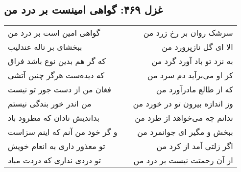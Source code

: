\begin{center}
\section*{غزل ۴۶۹: گواهی امینست بر درد من}
\label{sec:469}
\begin{longtable}{l p{0.5cm} r}
گواهی امین است بر درد من
&&
سرشک روان بر رخ زرد من
\\
ببخشای بر ناله عندلیب
&&
الا ای گل نازپرورد من
\\
که گر هم بدین نوع باشد فراق
&&
به نزد تو باد آورد گرد من
\\
که دیده‌ست هرگز چنین آتشی
&&
کز او می‌برآید دم سرد من
\\
فغان من از دست جور تو نیست
&&
که از طالع مادرآورد من
\\
من اندر خور بندگی نیستم
&&
وز اندازه بیرون تو در خورد من
\\
بداندیش نادان که مطرود باد
&&
ندانم چه می‌خواهد از طرد من
\\
و گر خود من آنم که اینم سزاست
&&
ببخش و مگیر ای جوانمرد من
\\
تو معذور داری به انعام خویش
&&
اگر زلتی آمد از کرد من
\\
تو دردی نداری که دردت مباد
&&
از آن رحمتت نیست بر درد من
\\
\end{longtable}
\end{center}
